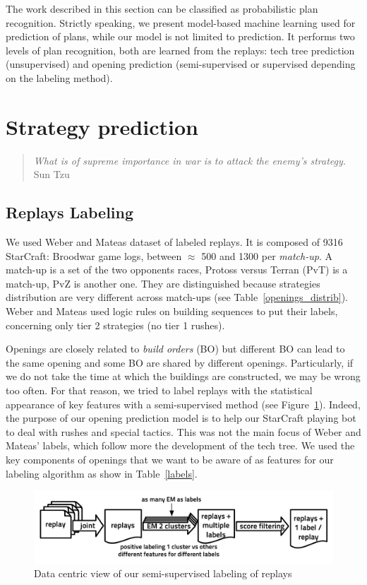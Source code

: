 The work described in this section can be classified as probabilistic plan recognition. Strictly speaking, we present model-based machine learning used for prediction of plans, while our model is not limited to prediction. It performs two levels of plan recognition, both are learned from the replays: tech tree prediction (unsupervised) and opening prediction (semi-supervised or supervised depending on the labeling method).


\section{Strategy prediction}

\begin{quotation}\textit{
What is of supreme importance in war is to attack the enemy's strategy.}\\
Sun Tzu\end{quotation}

\subsection{Replays Labeling}
We used Weber and Mateas \citep{weberStrat} dataset of labeled replays. It is composed of 9316 StarCraft: Broodwar game logs, between $\approx$ 500 and 1300 per \textit{match-up}. A match-up is a set of the two opponents races, Protoss versus Terran (PvT) is a match-up, PvZ is another one. They are distinguished because strategies distribution are very different across match-ups (see Table~\ref{openings_distrib}). Weber and Mateas used logic rules on building sequences to put their labels, concerning only tier 2 strategies (no tier 1 rushes).

Openings are closely related to \textit{build orders} (BO) but different BO can lead to the same opening and some BO are shared by different openings. Particularly, if we do not take the time at which the buildings are constructed, we may be wrong too often. For that reason, we tried to label replays with the statistical appearance of key features with a semi-supervised method (see Figure~\ref{replays_labeling}). Indeed, the purpose of our opening prediction model is to help our StarCraft playing bot to deal with rushes and special tactics. This was not the main focus of Weber and Mateas' labels, which follow more the development of the tech tree. We used the key components of openings that we want to be aware of as features for our labeling algorithm as show in Table~\ref{labels}.

\begin{figure}[htp]
\centerline{\includegraphics[width=0.76\columnwidth]{images/replays_labeling.pdf}}
\caption{Data centric view of our semi-supervised labeling of replays}
\label{replays_labeling}
\end{figure}


